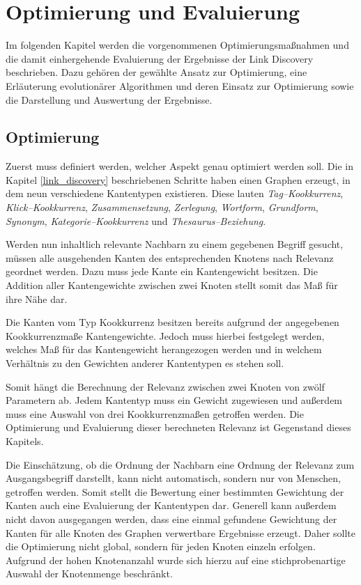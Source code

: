 \chapter{Optimierung und Evaluierung}

Im folgenden Kapitel werden die vorgenommenen Optimierungsmaßnahmen und die damit einhergehende Evaluierung der Ergebnisse der Link Discovery beschrieben. Dazu gehören der gewählte Ansatz zur Optimierung, eine Erläuterung evolutionärer Algorithmen und deren Einsatz zur Optimierung sowie die Darstellung und Auswertung der Ergebnisse.

\section{Optimierung}

Zuerst muss definiert werden, welcher Aspekt genau optimiert werden soll. Die in Kapitel \ref{link_discovery} beschriebenen Schritte haben einen Graphen erzeugt, in dem neun verschiedene Kantentypen existieren. Diese lauten \emph{Tag--Kookkurrenz}, \emph{Klick--Kookkurrenz}, \emph{Zusammensetzung}, \emph{Zerlegung}, \emph{Wortform}, \emph{Grundform}, \emph{Synonym}, \emph{Kategorie--Kookkurrenz} und \emph{Thesaurus--Beziehung}.

Werden nun inhaltlich relevante Nachbarn zu einem gegebenen Begriff gesucht, müssen alle ausgehenden Kanten des entsprechenden Knotens nach Relevanz geordnet werden. Dazu muss jede Kante ein Kantengewicht besitzen. Die Addition aller Kantengewichte zwischen zwei Knoten stellt somit das Maß für ihre Nähe dar.

Die Kanten vom Typ Kookkurrenz besitzen bereits aufgrund der angegebenen Kookkurrenzmaße Kantengewichte. Jedoch muss hierbei festgelegt werden, welches Maß für das Kantengewicht herangezogen werden und in welchem Verhältnis zu den Gewichten anderer Kantentypen es stehen soll.

Somit hängt die Berechnung der Relevanz zwischen zwei Knoten von zwölf Parametern ab. Jedem Kantentyp muss ein Gewicht zugewiesen und außerdem muss eine Auswahl von drei Kookkurrenzmaßen getroffen werden. Die Optimierung und Evaluierung dieser berechneten Relevanz ist Gegenstand dieses Kapitels.

Die Einschätzung, ob die Ordnung der Nachbarn eine Ordnung der Relevanz zum Ausgangsbegriff darstellt, kann nicht automatisch, sondern nur von Menschen, getroffen werden. Somit stellt die Bewertung einer bestimmten Gewichtung der Kanten auch eine Evaluierung der Kantentypen dar.
Generell kann außerdem nicht davon ausgegangen werden, dass eine einmal gefundene Gewichtung der Kanten für alle Knoten des Graphen verwertbare Ergebnisse erzeugt. Daher sollte die Optimierung nicht global, sondern für jeden Knoten einzeln erfolgen. Aufgrund der hohen Knotenanzahl wurde sich hierzu auf eine stichprobenartige Auswahl der Knotenmenge beschränkt.

